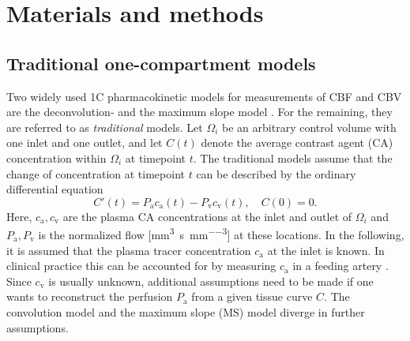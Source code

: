 \documentclass[10pt]{article}
\begin{document}
	

	

\section{Materials and methods}



	\subsection{Traditional one-compartment models}\label{sec:traditional}
	Two widely used 1C pharmacokinetic models for measurements of CBF and CBV  are the deconvolution- and the maximum slope model \cite{Feng2013,Chen2011,kudo10}.
	For the remaining, they are referred to as \emph{traditional} models.	Let $\Omega_i$ be an arbitrary control volume with one inlet and one outlet, and let $C(t)$ denote the average contrast agent (CA) concentration within $\Omega_i$ at timepoint $t$.
	The traditional models assume that the change of concentration at timepoint $t$ can be described by the ordinary differential equation 
	\begin{equation}\label{eq:classicgeneral}
		C'(t) = P_{\mathrm{a}}c_\mathrm{a}(t) - P_{\mathrm{v}}c_{\mathrm{v}}(t), \quad C(0) = 0.
	\end{equation}
	Here, $c_\mathrm{a},c_{\mathrm{v}}$ are the plasma CA concentrations at the inlet and outlet of $\Omega_i$ and $P_{\mathrm{a}},P_{\mathrm{v}}$ is the normalized flow [\si{\milli\meter\cubed\per\second\per\milli\meter\cubed}] at these locations.
	In the following, it is assumed that the plasma tracer concentration $c_\mathrm{a}$ at the inlet is known.
	In clinical practice this can be accounted for by measuring $c_\mathrm{a}$ in a feeding artery \cite{ostergaard96}.
	Since $c_{\mathrm{v}}$ is usually unknown, additional assumptions need to be made if one wants to reconstruct the perfusion $P_{\mathrm{a}}$ from a given tissue curve $C$. The convolution model and the maximum slope (MS) model diverge in further assumptions.

	

\end{document}
